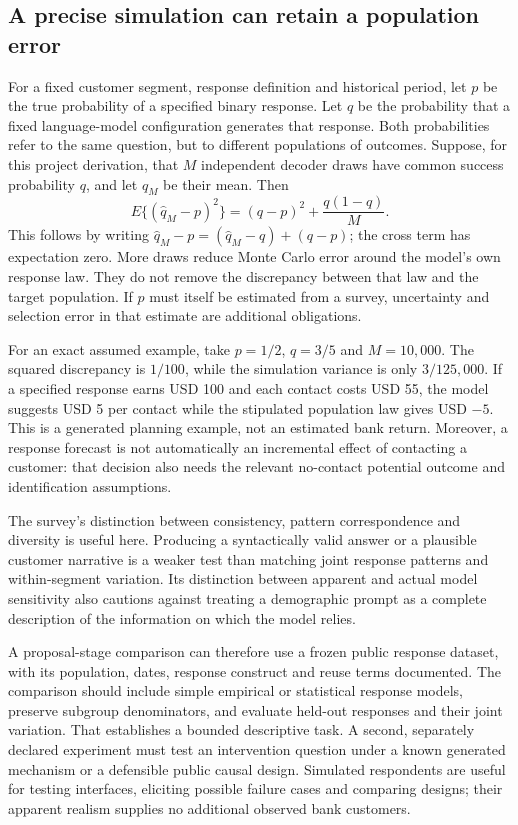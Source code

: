 \subsection{A precise simulation can retain a population error}
\label{exec20:pa-population}
For a fixed customer segment, response definition and historical period, let
$p$ be the true probability of a specified binary response. Let $q$ be the
probability that a fixed language-model configuration generates that response.
Both probabilities refer to the same question, but to different populations
of outcomes. Suppose, for this project derivation, that $M$ independent
decoder draws have common success probability $q$, and let $\widehat q_M$
be their mean. Then
\begin{equation}
 E\{(\widehat q_M-p)^2\}
   =(q-p)^2+\frac{q(1-q)}{M}.
 \label{exec20:pa-mse}
\end{equation}
This follows by writing $\widehat q_M-p=(\widehat q_M-q)+(q-p)$;
the cross term has expectation zero. More draws reduce Monte Carlo error
around the model's own response law. They do not remove the discrepancy
between that law and the target population. If $p$ must itself be estimated
from a survey, uncertainty and selection error in that estimate are additional
obligations.~\citep{exec20_population_attribution_reference}

For an exact assumed example, take $p=1/2$, $q=3/5$ and $M=10{,}000$.
The squared discrepancy is $1/100$, while the simulation variance is only
$3/125{,}000$. If a specified response earns USD 100 and each contact costs
USD 55, the model suggests USD 5 per contact while the stipulated population
law gives USD $-5$. This is a generated planning example, not an estimated
bank return. Moreover, a response forecast is not automatically an incremental
effect of contacting a customer: that decision also needs the relevant
no-contact potential outcome and identification assumptions.
\citep{exec20_population_attribution_reference}

The survey's distinction between consistency, pattern correspondence and
diversity is useful here. Producing a syntactically valid answer or a plausible
customer narrative is a weaker test than matching joint response patterns and
within-segment variation. Its distinction between apparent and actual model
sensitivity also cautions against treating a demographic prompt as a complete
description of the information on which the model relies.
\citep{exec20_population}

A proposal-stage comparison can therefore use a frozen public response
dataset, with its population, dates, response construct and reuse terms
documented. The comparison should include simple empirical or statistical
response models, preserve subgroup denominators, and evaluate held-out
responses and their joint variation. That establishes a bounded descriptive
task. A second, separately declared experiment must test an intervention
question under a known generated mechanism or a defensible public causal
design. Simulated respondents are useful for testing interfaces, eliciting
possible failure cases and comparing designs; their apparent realism supplies
no additional observed bank customers.

